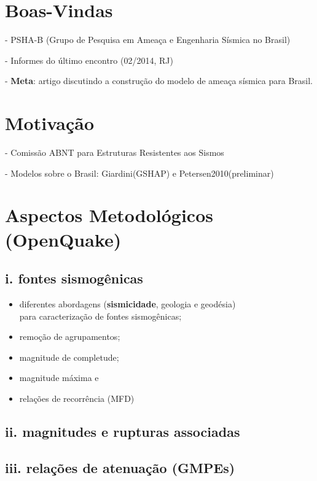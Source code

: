 \documentclass[a4paper,10pt,agenda]{meetingmins}
\begin{document}
\maketitle

\section{Boas-Vindas}
	
	- PSHA-B (Grupo de Pesquisa em Ameaça e Engenharia Sísmica no Brasil)
	
	- Informes do último encontro (02/2014, RJ)
	
	- \textbf{Meta}: artigo discutindo a construção do modelo de ameaça sísmica
	para Brasil.
	

\section{Motivação}
	
	- Comissão ABNT para Estruturas Resistentes aos Sismos
	
	- Modelos sobre o Brasil: Giardini(GSHAP) e Petersen2010(preliminar)

		
\section{Aspectos Metodológicos (OpenQuake)}
		
	\subsection{i. fontes sismogênicas}
		\begin{itemize}[leftmargin=2.5cm]
		  	\itemsep0.0em
			\item diferentes abordagens (\textbf{sismicidade}, geologia e geodésia) \\
				para caracterização de fontes sismogênicas;
			\item remoção de agrupamentos;
			\item magnitude de completude;
			\item magnitude máxima e
			\item relações de recorrência (MFD)
		\end{itemize}
	
	\subsection{ii. magnitudes e rupturas associadas}

	\subsection{iii. relações de atenuação (GMPEs)}
	
\end{document}
